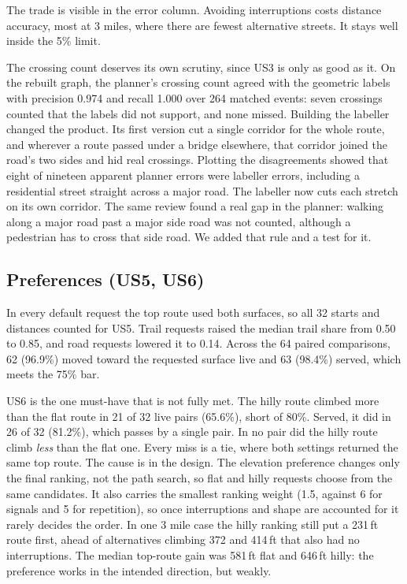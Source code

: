 The trade is visible in the error column. Avoiding interruptions costs
distance accuracy, most at 3 miles, where there are fewest alternative
streets. It stays well inside the 5\% limit.

The crossing count deserves its own scrutiny, since US3 is only as good as
it. On the rebuilt graph, the planner's crossing count agreed with the
geometric labels with precision 0.974 and recall 1.000 over 264 matched
events: seven crossings counted that the labels did not support, and none
missed. Building the labeller changed the product. Its first version cut a
single corridor for the whole route, and wherever a route passed under a
bridge elsewhere, that corridor joined the road's two sides and hid real
crossings. Plotting the disagreements showed that eight of nineteen apparent
planner errors were labeller errors, including a residential street straight
across a major road. The labeller now cuts each stretch on its own corridor.
The same review found a real gap in the planner: walking along a major road
past a major side road was not counted, although a pedestrian has to cross
that side road. We added that rule and a test for it.

\subsection{Preferences (US5, US6)}
In every default request the top route used both surfaces, so all 32 starts
and distances counted for US5. Trail requests raised the median trail share
from 0.50 to 0.85, and road requests lowered it to 0.14. Across the 64
paired comparisons, 62 (96.9\%) moved toward the requested surface live and
63 (98.4\%) served, which meets the 75\% bar.

US6 is the one must-have that is not fully met. The hilly route climbed more
than the flat route in 21 of 32 live pairs (65.6\%), short of 80\%. Served, it
did in 26 of 32 (81.2\%), which passes by a single pair. In no pair did the
hilly route climb \emph{less} than the flat one. Every miss is a tie, where
both settings returned the same top route. The cause is in the design. The
elevation preference changes only the final ranking, not the path search, so
flat and hilly requests choose from the same candidates. It also carries the
smallest ranking weight (1.5, against 6 for signals and 5 for repetition), so
once interruptions and shape are accounted for it rarely decides the order.
In one 3 mile case the hilly ranking still put a 231\,ft route first, ahead
of alternatives climbing 372 and 414\,ft that also had no interruptions. The
median top-route gain was 581\,ft flat and 646\,ft hilly: the preference
works in the intended direction, but weakly.

